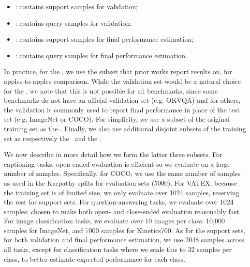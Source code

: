 \begin{itemize}
\item \metadevsupportshort: contains support samples for validation;
\item \metadevqueryshort: contains query samples for validation;
\item \metatestsupportshort: contains support samples for final performance estimation;
\item \metatestqueryshort: contains query samples for final performance estimation.
\end{itemize}

In practice, for the \metatestquery, we use the subset that prior works report results on, for apples-to-apples comparison. 
While the validation set would be a natural choice for the \metadevquery, we note that this is not possible for all benchmarks, since some benchmarks do not have an official validation set (e.g. OKVQA) and for others, the validation is commonly used to report final performance in place of the test set (e.g. ImageNet or COCO).
For simplicity, we use a subset of the original training set as the \metadevquery.
Finally, we also use additional disjoint subsets of the training set as respectively the \metadevsupport~and the \metatestsupport. 

We now describe in more detail how we form the latter three subsets. For captioning tasks, open-ended evaluation is efficient so we evaluate on a large number of samples. Specifically, for COCO, we use the same number of samples as used in the Karpathy splits for evaluation sets (5000). For VATEX, because the training set is of limited size, we only evaluate over 1024 samples, reserving the rest for support sets. For question-answering tasks, we evaluate over 1024 samples; chosen to make both open- and close-ended evaluation reasonably fast. 
For image classification tasks, we evaluate over 10 images per class: 10,000 samples for ImageNet, and 7000 samples for Kinetics700.
As for the support sets, for both validation and final performance estimation, we use 2048 samples across all tasks, except for classification tasks where we scale this to 32 samples per class, to better estimate expected performance for each class.

